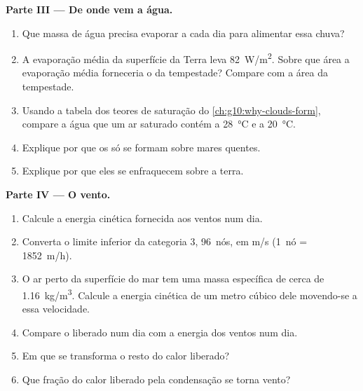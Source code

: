 \begin{problem}
\medskip
\noindent\textbf{Parte III --- De onde vem a água.}
\begin{enumerate}[resume]
  \item Que massa de água precisa evaporar a cada dia para alimentar essa
        chuva?
  \item A evaporação média da superfície da Terra leva
        \qty{82}{W/m^2}. Sobre que área a evaporação média forneceria o
         da tempestade? Compare com a área da tempestade.
  \item Usando a tabela dos teores de saturação do
        \cref{ch:g10:why-clouds-form}, compare a água que um ar saturado
        contém a \qty{28}{\degreeCelsius} e a \qty{20}{\degreeCelsius}.
  \item Explique por que os  só se formam sobre mares
        quentes.
  \item Explique por que eles se enfraquecem sobre a terra.
\end{enumerate}

\medskip
\noindent\textbf{Parte IV --- O vento.}
\begin{enumerate}[resume]
  \item Calcule a energia cinética fornecida aos ventos num dia.
  \item Converta o limite inferior da categoria 3, \num{96}~nós, em
        \unit{m/s} (\num{1}~nó = \qty{1852}{m/h}).
  \item O ar perto da superfície do mar tem uma massa específica de cerca
        de \qty{1.16}{kg/m^3}. Calcule a energia cinética de um metro cúbico
        dele movendo-se a essa velocidade.
  \item Compare o  liberado num dia com a energia dos ventos
        num dia.
  \item Em que se transforma o resto do calor liberado?
  \item Que fração do calor liberado pela condensação se torna vento?
\end{enumerate}
\end{problem}
